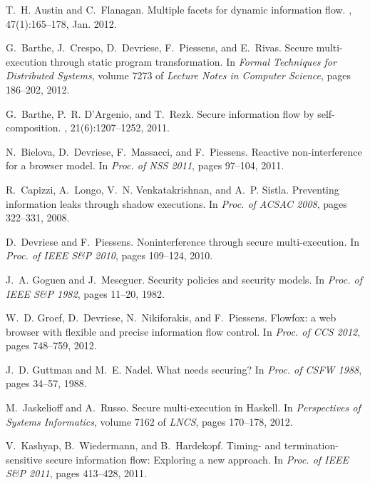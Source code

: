 \documentclass[10pt,a4paper,oneside]{article}
\begin{document}
\newpage
\begin{thebibliography}{10}

T.~H. Austin and C.~Flanagan.
\newblock Multiple facets for dynamic information flow.
, 47(1):165--178, Jan. 2012.

G.~Barthe, J.~Crespo, D.~Devriese, F.~Piessens, and E.~Rivas.
\newblock Secure multi-execution through static program transformation.
\newblock In {\em Formal Techniques for Distributed Systems}, volume 7273 of
  {\em Lecture Notes in Computer Science}, pages 186--202, 2012.

G.~Barthe, P.~R. D'Argenio, and T.~Rezk.
\newblock Secure information flow by self-composition.
, 21(6):1207--1252,
  2011.

N.~Bielova, D.~Devriese, F.~Massacci, and F.~Piessens.
\newblock Reactive non-interference for a browser model.
\newblock In {\em Proc. of NSS 2011}, pages 97--104, 2011.

R.~Capizzi, A.~Longo, V.~N. Venkatakrishnan, and A.~P. Sistla.
\newblock Preventing information leaks through shadow executions.
\newblock In {\em Proc. of ACSAC 2008}, pages 322--331, 2008.

D.~Devriese and F.~Piessens.
\newblock Noninterference through secure multi-execution.
\newblock In {\em Proc. of IEEE S\&P 2010}, pages 109--124, 2010.

J.~A. Goguen and J.~Meseguer.
\newblock Security policies and security models.
\newblock In {\em Proc. of IEEE S\&P 1982}, pages 11--20, 1982.

W.~D. Groef, D.~Devriese, N.~Nikiforakis, and F.~Piessens.
\newblock Flowfox: a web browser with flexible and precise information flow
  control.
\newblock In {\em Proc. of CCS 2012}, pages 748--759, 2012.

J.~D. Guttman and M.~E. Nadel.
\newblock What needs securing?
\newblock In {\em Proc. of CSFW 1988}, pages 34--57, 1988.

M.~Jaskelioff and A.~Russo.
\newblock Secure multi-execution in {H}askell.
\newblock In {\em Perspectives of Systems Informatics}, volume 7162 of {\em
  LNCS}, pages 170--178, 2012.

V.~Kashyap, B.~Wiedermann, and B.~Hardekopf.
\newblock Timing- and termination-sensitive secure information flow: Exploring
  a new approach.
\newblock In {\em Proc. of IEEE S\&P 2011}, pages 413--428, 2011.


\end{thebibliography}
\end{document}
